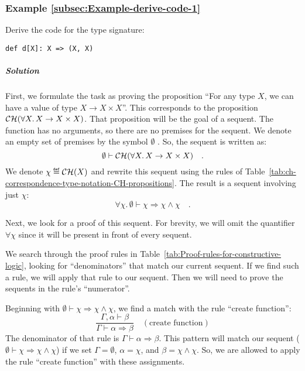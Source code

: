 \subsubsection{Example \label{subsec:Example-derive-code-1}\ref{subsec:Example-derive-code-1}}

Derive the code for the type signature:
\begin{lstlisting}
def d[X]: X => (X, X)
\end{lstlisting}


\subparagraph{Solution}

First, we formulate the task as proving the proposition \textsf{``}For any
type $X$, we can have a value of type $X\rightarrow X\times X$\textsf{''}.
This corresponds to the proposition ${\cal CH}(\forall X.\,X\rightarrow X\times X)$.
That proposition will be the goal of a sequent. The function has no
arguments, so there are no premises for the sequent. We denote an
empty set of premises by the symbol $\emptyset$ .
So, the sequent is written as:
\[
\emptyset\vdash{\cal CH}(\forall X.\,X\rightarrow X\times X)\quad.
\]
We denote $\chi\triangleq{\cal CH}(X)$ and rewrite this sequent using
the rules of Table~\ref{tab:ch-correspondence-type-notation-CH-propositions}.
The result is a sequent involving just $\chi$:
\[
\forall\chi.\,\emptyset\vdash\chi\Rightarrow\chi\wedge\chi\quad.
\]

Next, we look for a proof of this sequent. For brevity, we will omit
the quantifier $\forall\chi$ since it will be present in front of
every sequent.

We search through the proof rules in Table~\ref{tab:Proof-rules-for-constructive-logic},
looking for \textsf{``}denominators\textsf{''} that match our current sequent. If
we find such a rule, we will apply that rule to our sequent. Then
we will need to prove the sequents in the rule\textsf{'}s \textsf{``}numerator\textsf{''}.

Beginning with $\emptyset\vdash\chi\Rightarrow\chi\wedge\chi$, we
find a match with the rule \textsf{``}create function\textsf{''}: 
\[
\frac{\Gamma,\alpha\vdash\beta}{\Gamma\vdash\alpha\Rightarrow\beta}\quad(\text{create function})
\]
The denominator of that rule is $\Gamma\vdash\alpha\Rightarrow\beta$.
This pattern will match our sequent ($\emptyset\vdash\chi\Rightarrow\chi\wedge\chi$)
if we set $\Gamma=\emptyset$, $\alpha=\chi$, and $\beta=\chi\wedge\chi$.
So, we are allowed to apply the rule \textsf{``}create function\textsf{''} with these
assignments.

